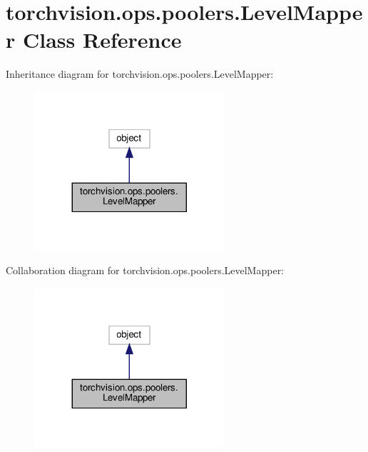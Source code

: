 \hypertarget{classtorchvision_1_1ops_1_1poolers_1_1LevelMapper}{}\section{torchvision.\+ops.\+poolers.\+Level\+Mapper Class Reference}
\label{classtorchvision_1_1ops_1_1poolers_1_1LevelMapper}


Inheritance diagram for torchvision.\+ops.\+poolers.\+Level\+Mapper\+:
\nopagebreak
\begin{figure}[H]
\begin{center}
\leavevmode
\includegraphics[width=200pt]{classtorchvision_1_1ops_1_1poolers_1_1LevelMapper__inherit__graph}
\end{center}
\end{figure}


Collaboration diagram for torchvision.\+ops.\+poolers.\+Level\+Mapper\+:
\nopagebreak
\begin{figure}[H]
\begin{center}
\leavevmode
\includegraphics[width=200pt]{classtorchvision_1_1ops_1_1poolers_1_1LevelMapper__coll__graph}
\end{center}
\end{figure}
